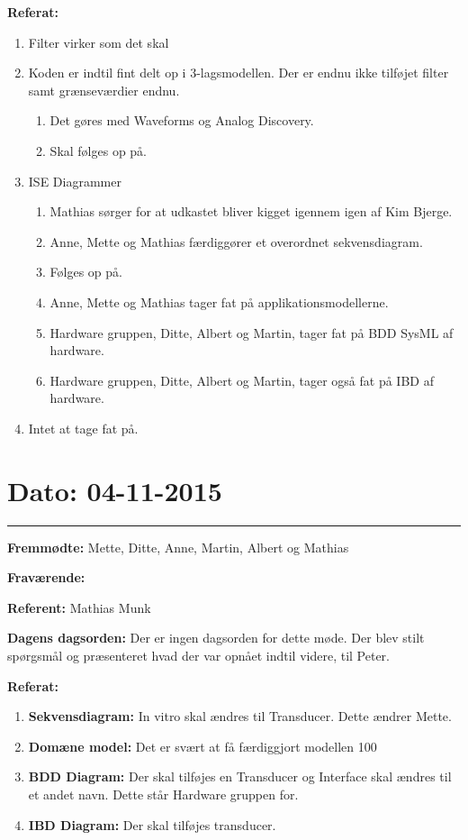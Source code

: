 \textbf{Referat:}
\newline 
\begin{enumerate}
\item Filter virker som det skal
\item Koden er indtil fint delt op i 3-lagsmodellen. Der er endnu ikke tilføjet filter samt grænseværdier endnu.
\begin{enumerate}
\item Det gøres med Waveforms og Analog Discovery.
\item Skal følges op på.
\end{enumerate}
\item ISE Diagrammer
\begin{enumerate}
\item Mathias sørger for at udkastet bliver kigget igennem igen af Kim Bjerge.
\item Anne, Mette og Mathias færdiggører et overordnet sekvensdiagram.
\item Følges op på.
\item Anne, Mette og Mathias tager fat på applikationsmodellerne.
\item Hardware gruppen, Ditte, Albert og Martin, tager fat på BDD SysML af hardware.
\item Hardware gruppen, Ditte, Albert og Martin, tager også fat på IBD af hardware.
\end{enumerate}
\item Intet at tage fat på.
\end{enumerate}

\section{Dato: 04-11-2015}
\hrule

\textbf{Fremmødte:} Mette, Ditte, Anne, Martin, Albert og Mathias 

\textbf{Fraværende:}

\textbf{Referent:} Mathias Munk

\textbf{Dagens dagsorden:}
Der er ingen dagsorden for dette møde. Der blev stilt spørgsmål og præsenteret hvad der var opnået indtil videre, til Peter.

\textbf{Referat:}
\newline 
\begin{enumerate}
\item \textbf{Sekvensdiagram: }In vitro skal ændres til Transducer. Dette ændrer Mette.
\item \textbf{Domæne model: }Det er svært at få færdiggjort modellen 100%
\item \textbf{BDD Diagram: }Der skal tilføjes en Transducer og Interface skal ændres til et andet navn. Dette står Hardware gruppen for.
\item \textbf{IBD Diagram: }Der skal tilføjes transducer.
\end{enumerate}

